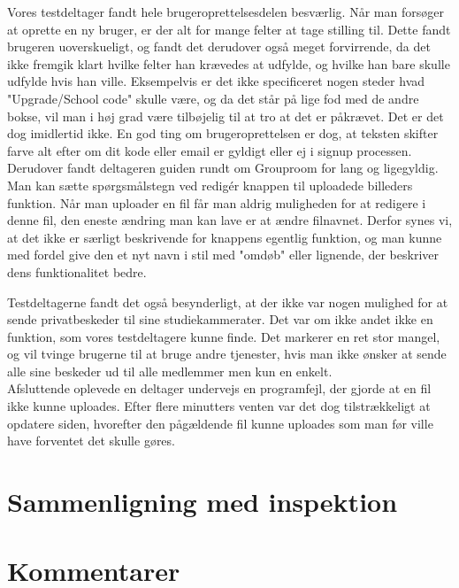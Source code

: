 \documentclass[12pt]{article}
\begin{document}
\noindent Vores testdeltager fandt hele brugeroprettelsesdelen besværlig. Når man forsøger at oprette en ny bruger, er der alt for mange felter at tage stilling til. Dette fandt brugeren uoverskueligt, og fandt det derudover også meget forvirrende, da det ikke fremgik klart hvilke felter han krævedes at udfylde, og hvilke han bare skulle udfylde hvis han ville. Eksempelvis er det ikke specificeret nogen steder hvad "Upgrade/School code" skulle være, og da det står på lige fod med de andre bokse, vil man i høj grad være tilbøjelig til at tro at det er påkrævet. Det er det dog imidlertid ikke. En god ting om brugeroprettelsen er dog, at teksten skifter farve alt efter om dit kode eller email er gyldigt eller ej i signup processen. Derudover fandt deltageren guiden rundt om Grouproom for lang og ligegyldig.\\

\noindent Man kan sætte spørgsmålstegn ved redigér knappen til uploadede billeders funktion. Når man uploader en fil får man aldrig muligheden for at redigere i denne fil, den eneste ændring man kan lave er at ændre filnavnet. Derfor synes vi, at det ikke er særligt beskrivende for knappens egentlig funktion, og man kunne med fordel give den et nyt navn i stil med "omdøb" eller lignende, der beskriver dens funktionalitet bedre.\\

\newpage

\noindent Testdeltagerne fandt det også besynderligt, at der ikke var nogen mulighed for at sende privatbeskeder til sine studiekammerater. Det var om ikke andet ikke en funktion, som vores testdeltagere kunne finde. Det markerer en ret stor mangel, og vil tvinge brugerne til at bruge andre tjenester, hvis man ikke ønsker at sende alle sine beskeder ud til alle medlemmer men kun en enkelt.\\

\noindent Afsluttende oplevede en deltager undervejs en programfejl, der gjorde at en fil ikke kunne uploades. Efter flere minutters venten var det dog tilstrækkeligt at opdatere siden, hvorefter den pågældende fil kunne uploades som man før ville have forventet det skulle gøres.
\section{Sammenligning med inspektion}

\section{Kommentarer}
\end{document}
